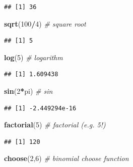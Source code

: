 \documentclass[]{book}
\newenvironment{Shaded}{\begin{snugshade}}{\end{snugshade}}
\newcommand{\KeywordTok}[1]{\textcolor[rgb]{0.13,0.29,0.53}{\textbf{#1}}}
\newcommand{\DecValTok}[1]{\textcolor[rgb]{0.00,0.00,0.81}{#1}}
\newcommand{\CommentTok}[1]{\textcolor[rgb]{0.56,0.35,0.01}{\textit{#1}}}
\newcommand{\OperatorTok}[1]{\textcolor[rgb]{0.81,0.36,0.00}{\textbf{#1}}}
\newcommand{\NormalTok}[1]{#1}
\theoremstyle{definition}
\theoremstyle{definition}
\theoremstyle{definition}
\theoremstyle{remark}
\begin{document}
\begin{verbatim}
## [1] 36
\end{verbatim}

\begin{Shaded}
\begin{Highlighting}[]
\KeywordTok{sqrt}\NormalTok{(}\DecValTok{100}\OperatorTok{/}\DecValTok{4}\NormalTok{) }\CommentTok{# square root }
\end{Highlighting}
\end{Shaded}

\begin{verbatim}
## [1] 5
\end{verbatim}

\begin{Shaded}
\begin{Highlighting}[]
\KeywordTok{log}\NormalTok{(}\DecValTok{5}\NormalTok{) }\CommentTok{# logarithm}
\end{Highlighting}
\end{Shaded}

\begin{verbatim}
## [1] 1.609438
\end{verbatim}

\begin{Shaded}
\begin{Highlighting}[]
\KeywordTok{sin}\NormalTok{(}\DecValTok{2}\OperatorTok{*}\NormalTok{pi) }\CommentTok{# sin}
\end{Highlighting}
\end{Shaded}

\begin{verbatim}
## [1] -2.449294e-16
\end{verbatim}

\begin{Shaded}
\begin{Highlighting}[]
\KeywordTok{factorial}\NormalTok{(}\DecValTok{5}\NormalTok{) }\CommentTok{# factorial (e.g. 5!)}
\end{Highlighting}
\end{Shaded}

\begin{verbatim}
## [1] 120
\end{verbatim}

\begin{Shaded}
\begin{Highlighting}[]
\KeywordTok{choose}\NormalTok{(}\DecValTok{2}\NormalTok{,}\DecValTok{6}\NormalTok{) }\CommentTok{# binomial choose function}
\end{Highlighting}
\end{Shaded}
\end{document}
